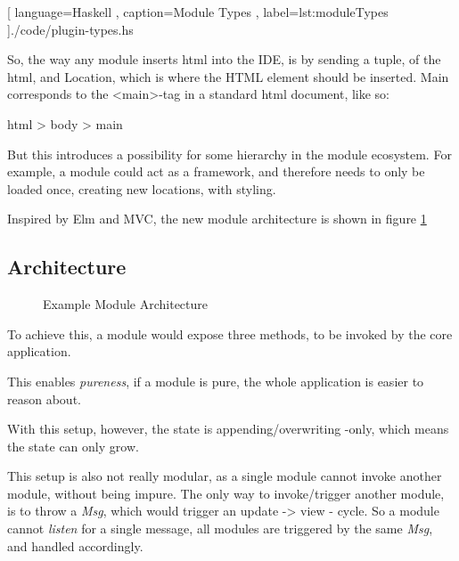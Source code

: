 \begin{center}
  
    [ language=Haskell
    , caption={Module Types}
    , label=lst:moduleTypes
    ]{./code/plugin-types.hs}
\end{center}

So, the way any module inserts \gls{html} into the IDE, is by sending a tuple,
of the \gls{html}, and Location, which is where the HTML element should be
inserted. Main corresponds to the <main>-tag in a standard \gls{html} document,
like so:

html > body > main

But this introduces a possibility for some hierarchy in the module ecosystem.
For example, a module could act as a framework, and therefore needs to only be
loaded once, creating new locations, with styling.

Inspired by Elm and MVC, the new module architecture is shown in figure
\ref{fig:moduleArchitecture}

\subsection{Architecture}
\begin{figure}
  \centering
  
  \caption{Example Module Architecture}
  \label{fig:moduleArchitecture}
\end{figure}

To achieve this, a module would expose three methods, to be invoked by the core
application.

This enables \textit{pureness}, if a module is pure, the whole application is
easier to reason about.

With this setup, however, the state is appending/overwriting -only, which means
the state can only grow.

This setup is also not really modular, as a single module cannot invoke another
module, without being impure. The only way to invoke/trigger another module, is
to throw a \textit{Msg}, which would trigger an update -> view - cycle. So
a module cannot \textit{listen} for a single message, all modules are triggered
by the same \textit{Msg}, and handled accordingly.

